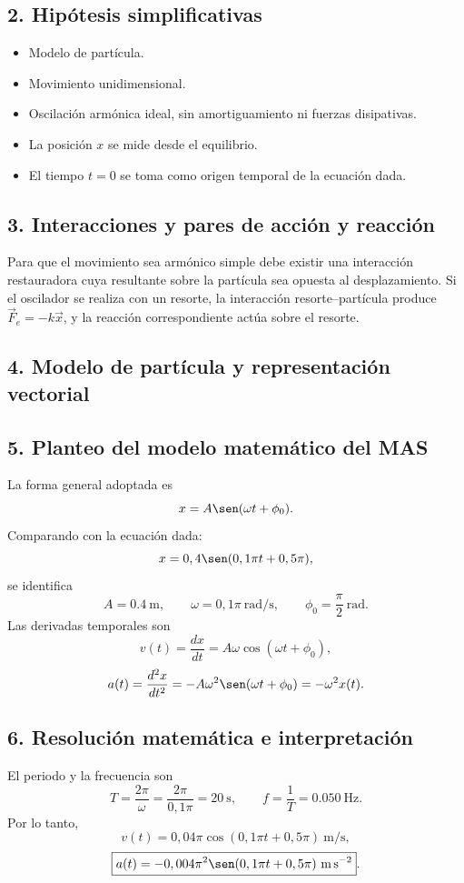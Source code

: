 \documentclass[12pt]{article}
\newcommand{\paso}[2]{%
  \subsection*{\color{AzulFisica}#1. #2}%
}
\begin{document}
\paso{2}{Hipótesis simplificativas}
\begin{itemize}[itemsep=2pt]
  \item Modelo de partícula.
  \item Movimiento unidimensional.
  \item Oscilación armónica ideal, sin amortiguamiento ni fuerzas disipativas.
  \item La posición $x$ se mide desde el equilibrio.
  \item El tiempo $t=0$ se toma como origen temporal de la ecuación dada.
\end{itemize}

\paso{3}{Interacciones y pares de acción y reacción}
Para que el movimiento sea armónico simple debe existir una interacción restauradora cuya resultante sobre la partícula sea opuesta al desplazamiento. Si el oscilador se realiza con un resorte, la interacción resorte--partícula produce $\vec F_e=-k\vec x$, y la reacción correspondiente actúa sobre el resorte.

\paso{4}{Modelo de partícula y representación vectorial}
\begin{center}
\end{center}

\paso{5}{Planteo del modelo matemático del MAS}
La forma general adoptada es
\[
x=A\sen(\omega t+\phi_0).
\]
Comparando con la ecuación dada:
\[
x=0,4\sen(0,1\pi t+0,5\pi),
\]
se identifica
\[
A=\SI{0.4}{\meter},\qquad
\omega=0,1\pi\ \si{\radian\per\second},\qquad
\phi_0=\frac{\pi}{2}\ \si{\radian}.
\]
Las derivadas temporales son
\[
v(t)=\frac{dx}{dt}=A\omega\cos(\omega t+\phi_0),
\]
\[
a(t)=\frac{d^2x}{dt^2}=-A\omega^2\sen(\omega t+\phi_0)=-\omega^2x(t).
\]

\paso{6}{Resolución matemática e interpretación}
El periodo y la frecuencia son
\[
T=\frac{2\pi}{\omega}=\frac{2\pi}{0,1\pi}=\boxed{\SI{20}{\second}},
\qquad
f=\frac1T=\boxed{\SI{0.050}{\hertz}}.
\]
Por lo tanto,
\[
\boxed{v(t)=0,04\pi\cos(0,1\pi t+0,5\pi)\ \si{\meter\per\second}},
\]
\[
\boxed{a(t)=-0,004\pi^2\sen(0,1\pi t+0,5\pi)\ \si{\meter\per\second\squared}}.
\]
\end{document}
